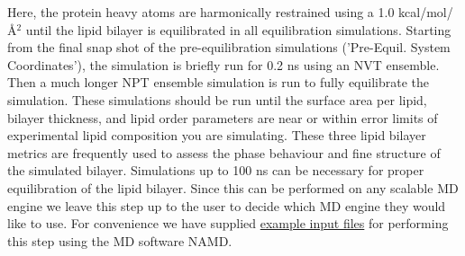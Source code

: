 
Here, the protein heavy atoms are harmonically restrained using a 1.0 kcal/mol/{\AA}$^2$ until the lipid bilayer is equilibrated in all equilibration simulations.
Starting from the final snap shot of the pre-equilibration simulations ('Pre-Equil. System Coordinates'), the simulation is briefly run for 0.2 ns using an NVT ensemble.
Then a much longer NPT ensemble simulation is run to fully equilibrate the simulation. 
These simulations should be run until the surface area per lipid, bilayer thickness, and lipid order parameters are near or within error limits of experimental lipid composition you are simulating.\cite{Huang_Shen_2021_MethodsinMolecularBiology}
These three lipid bilayer metrics are frequently used to assess the phase behaviour and fine structure of the simulated bilayer.\cite{Klauda_Pastor_2010_J.Phys.Chem.B}
Simulations up to 100 ns can be necessary for proper equilibration of the lipid bilayer.
Since this can be performed on any scalable MD engine we leave this step up to the user to decide which MD engine they would like to use.
For convenience we have supplied \href{}{example input files} for performing this step using the MD software NAMD.\cite{Phillips_Schulten_2005_J.Comput.Chem.}

